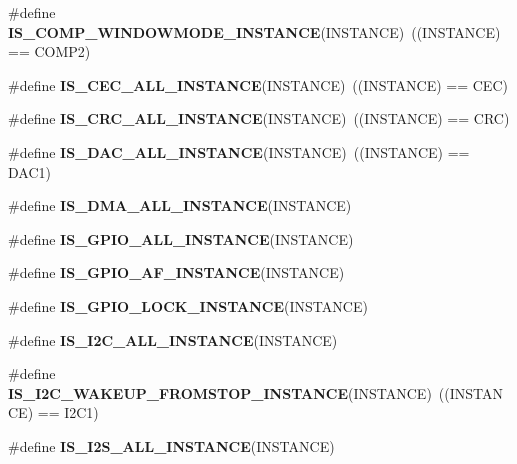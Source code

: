 \begin{DoxyCompactItemize}
\#define {\bfseries I\+S\+\_\+\+C\+O\+M\+P\+\_\+\+W\+I\+N\+D\+O\+W\+M\+O\+D\+E\+\_\+\+I\+N\+S\+T\+A\+N\+CE}(I\+N\+S\+T\+A\+N\+CE)~((I\+N\+S\+T\+A\+N\+CE) == C\+O\+M\+P2)
\item 
\mbox{\label{group___exported__macro_ga10cad35fdea5ffcb9f17973ce98c7dee}} 
\#define {\bfseries I\+S\+\_\+\+C\+E\+C\+\_\+\+A\+L\+L\+\_\+\+I\+N\+S\+T\+A\+N\+CE}(I\+N\+S\+T\+A\+N\+CE)~((I\+N\+S\+T\+A\+N\+CE) == C\+EC)
\item 
\mbox{\label{group___exported__macro_gaa514941a7f02f65eb27450c05e4e8dd1}} 
\#define {\bfseries I\+S\+\_\+\+C\+R\+C\+\_\+\+A\+L\+L\+\_\+\+I\+N\+S\+T\+A\+N\+CE}(I\+N\+S\+T\+A\+N\+CE)~((I\+N\+S\+T\+A\+N\+CE) == C\+RC)
\item 
\mbox{\label{group___exported__macro_ga94426b97cc5f1644d67f291cbcdba6d8}} 
\#define {\bfseries I\+S\+\_\+\+D\+A\+C\+\_\+\+A\+L\+L\+\_\+\+I\+N\+S\+T\+A\+N\+CE}(I\+N\+S\+T\+A\+N\+CE)~((I\+N\+S\+T\+A\+N\+CE) == D\+A\+C1)
\item 
\#define {\bfseries I\+S\+\_\+\+D\+M\+A\+\_\+\+A\+L\+L\+\_\+\+I\+N\+S\+T\+A\+N\+CE}(I\+N\+S\+T\+A\+N\+CE)
\item 
\#define {\bfseries I\+S\+\_\+\+G\+P\+I\+O\+\_\+\+A\+L\+L\+\_\+\+I\+N\+S\+T\+A\+N\+CE}(I\+N\+S\+T\+A\+N\+CE)
\item 
\#define {\bfseries I\+S\+\_\+\+G\+P\+I\+O\+\_\+\+A\+F\+\_\+\+I\+N\+S\+T\+A\+N\+CE}(I\+N\+S\+T\+A\+N\+CE)
\item 
\#define {\bfseries I\+S\+\_\+\+G\+P\+I\+O\+\_\+\+L\+O\+C\+K\+\_\+\+I\+N\+S\+T\+A\+N\+CE}(I\+N\+S\+T\+A\+N\+CE)
\item 
\#define {\bfseries I\+S\+\_\+\+I2\+C\+\_\+\+A\+L\+L\+\_\+\+I\+N\+S\+T\+A\+N\+CE}(I\+N\+S\+T\+A\+N\+CE)
\item 
\mbox{\label{group___exported__macro_gadf692bda16bac3264bccff7f59ddaab9}} 
\#define {\bfseries I\+S\+\_\+\+I2\+C\+\_\+\+W\+A\+K\+E\+U\+P\+\_\+\+F\+R\+O\+M\+S\+T\+O\+P\+\_\+\+I\+N\+S\+T\+A\+N\+CE}(I\+N\+S\+T\+A\+N\+CE)~((I\+N\+S\+T\+A\+N\+CE) == I2\+C1)
\item 
\#define {\bfseries I\+S\+\_\+\+I2\+S\+\_\+\+A\+L\+L\+\_\+\+I\+N\+S\+T\+A\+N\+CE}(I\+N\+S\+T\+A\+N\+CE)
\item 
\mbox{\label{group___exported__macro_gad9ec4c52f0572ee67d043e006f1d5e39}} 

\end{DoxyCompactItemize}
